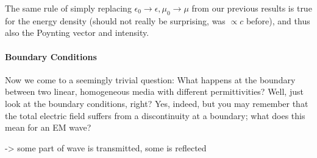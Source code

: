 \documentclass[../class_mech_main.tex]{subfiles}
\begin{document}
The same rule of simply replacing $\epsilon_0 \rightarrow \epsilon, \mu_0 \rightarrow \mu$ from our previous results is true for the energy density (should not really be surprising, was $\propto c$ before), and thus also the Poynting vector and intensity.



            \paragraph{Boundary Conditions}
Now we come to a seemingly trivial question: What happens at the boundary between two linear, homogeneous media with different permittivities? Well, just look at the boundary conditions, right? Yes, indeed, but you may remember that the total electric field suffers from a discontinuity at a boundary; what does this mean for an EM wave?


-> some part of wave is transmitted, some is reflected
\end{document}

